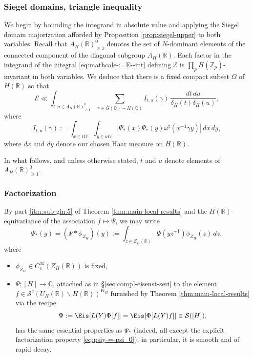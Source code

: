 \subsubsection{Siegel domains, triangle inequality}
We begin by bounding the integrand in absolute value and applying the Siegel domain majorization afforded by Proposition \ref{prop:siegel-upper} to both variables.  Recall that $A_H(\mathbb{R})^0_{\geq 1}$ denotes the set of $N$-dominant elements of the connected component of the diagonal subgroup $A_H(\mathbb{R})$.  Each factor in the integrand of the integral \eqref{eq:mathcale-:=E--int} defining $\mathcal{E}$ is $\prod_{p} H(\mathbb{Z}_p)$-invariant in both variables.  We deduce that there is a fixed compact subset $\Omega$ of $H(\mathbb{R})$ so that
\begin{equation}\label{eq:mathcale-ll-int}
  \mathcal{E} \ll \int_{t, u \in A_H(\mathbb{R})^0_{\geq 1} } \sum_{\gamma \in \bar{G}(\mathbb{Q}) - H(\mathbb{Q})} I_{t, u}(\gamma)
  \, \frac{d t \, d u}{\delta_H(t) \delta_H(u)},
\end{equation}
where
\begin{equation*}
  I_{t,u}(\gamma) :=
  \int_{x \in t \Omega}
  \int_{y \in u \Omega}
  \left\lvert \Psi_{\ast}(x) \Psi_{\ast}(y)
    \omega^\sharp (x^{-1} \gamma y)
  \right\rvert
  \,d x \,d y,
\end{equation*}
where $d x$ and $d y$ denote our chosen Haar measure on $H(\mathbb{R})$.

In what follows, and unless otherwise stated, $t$ and $u$ denote elements of $A_H(\mathbb{R})^0_{\geq 1}$.

\subsubsection{Factorization}
By part \eqref{itm:sub-gln:5} of Theorem \ref{thm:main-local-results} and the $H(\mathbb{R})$-equivariance of the association $f \mapsto \Psi$, we may write
\begin{equation}\label{eq:psiy-=-psi_0}
  \Psi_{\ast}(y) = (\Psi \ast \phi_{Z_H})(y) := \int_{z \in Z_H(\mathbb{R})} \Psi(y z^{-1}) \phi_{Z_H}(z) \, d z,
\end{equation}
where
\begin{itemize}
\item $\phi_{Z_H} \in C_c^\infty(Z_H(\mathbb{R}))$ is fixed,
\item $\Psi : [H] \rightarrow \mathbb{C}$, attached as in \S\ref{sec:compl-eisenst-seri} to the element $f \in \mathcal{S}^e(U_H(\mathbb{R}) \backslash H(\mathbb{R}))^{W_H}$ furnished by Theorem \ref{thm:main-local-results} via the recipe
  \begin{equation*}
    \Psi := \Eis[L(Y) \Phi[f]] = \Eis[\Phi[L(Y) f]] \in \mathcal{S}([H]),
  \end{equation*}
  has the same essential properties as $\Psi_{\ast}$ (indeed, all except the explicit factorization property \eqref{eq:psiy-=-psi_0}); in particular, it is smooth and of rapid decay.
\end{itemize}



